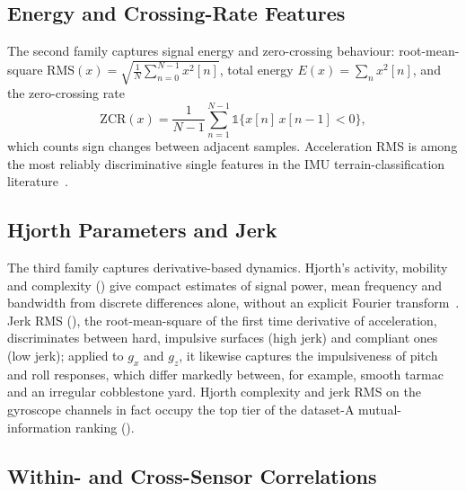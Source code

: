 \subsection{Energy and Crossing-Rate Features}

The second family captures signal energy and zero-crossing behaviour: root-mean-square $\mathrm{RMS}(x) = \sqrt{\frac{1}{N}\sum_{n=0}^{N-1} x^{2}[n]}$, total energy $E(x)=\sum_{n} x^{2}[n]$, and the zero-crossing rate
\begin{equation}
    \mathrm{ZCR}(x) = \frac{1}{N-1}\sum_{n=1}^{N-1} \mathbb{1}\bigl\{x[n]\,x[n-1] < 0\bigr\},
    \label{eq:zcr}
\end{equation}
which counts sign changes between adjacent samples. Acceleration RMS is among the most reliably discriminative single features in the IMU terrain-classification literature~\cite{Brooks2005,Weiss2011}.

\subsection{Hjorth Parameters and Jerk}

The third family captures derivative-based dynamics. Hjorth's activity, mobility and complexity () give compact estimates of signal power, mean frequency and bandwidth from discrete differences alone, without an explicit Fourier transform~\cite{Hjorth1970}. Jerk RMS (), the root-mean-square of the first time derivative of acceleration, discriminates between hard, impulsive surfaces (high jerk) and compliant ones (low jerk); applied to $g_x$ and $g_z$, it likewise captures the impulsiveness of pitch and roll responses, which differ markedly between, for example, smooth tarmac and an irregular cobblestone yard. Hjorth complexity and jerk RMS on the gyroscope channels in fact occupy the top tier of the dataset-A mutual-information ranking ().

\subsection{Within- and Cross-Sensor Correlations}

